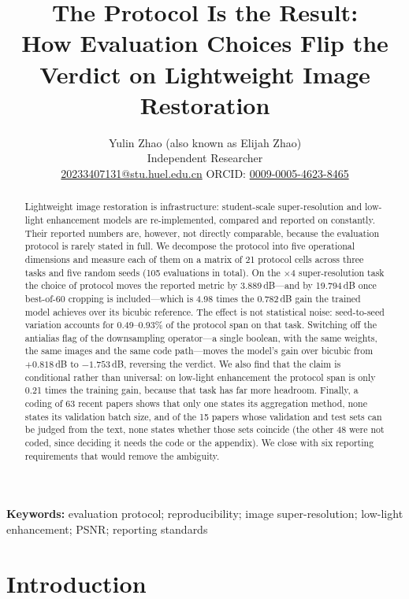 \documentclass[10pt,twocolumn]{article}
\title{\textbf{The Protocol Is the Result:}\\
How Evaluation Choices Flip the Verdict on Lightweight Image Restoration}
\author{Yulin Zhao \quad (also known as Elijah Zhao)\\
Independent Researcher\\
\href{mailto:20233407131@stu.huel.edu.cn}{20233407131@stu.huel.edu.cn}\quad
ORCID: \href{https://orcid.org/0009-0005-4623-8465}{0009-0005-4623-8465}}
\date{}
\begin{document}
\maketitle

\begin{abstract}
Lightweight image restoration is infrastructure: student-scale super-resolution
and low-light enhancement models are re-implemented, compared and reported on
constantly. Their reported numbers are, however, not directly comparable,
because the evaluation protocol is rarely stated in full. We decompose the
protocol into five operational dimensions and measure each of them on a
matrix of 21 protocol cells across three tasks and five random seeds (105
evaluations in total). On the $\times$4 super-resolution task the choice of
protocol moves the reported metric by 3.889\,dB---and by 19.794\,dB once
best-of-60 cropping is included---which is 4.98 times the 0.782\,dB gain the
trained model achieves over its bicubic reference. The effect is not
statistical noise: seed-to-seed variation accounts for 0.49--0.93\% of the
protocol span on that task. Switching off the antialias flag of the
downsampling operator---a single boolean, with the same weights, the same
images and the same code path---moves the model's gain over bicubic from
$+0.818$\,dB to $-1.753$\,dB, reversing the verdict. We also find that the
claim is conditional rather than universal: on low-light enhancement the
protocol span is only 0.21 times the training gain, because that task has
far more headroom. Finally, a coding of 63 recent papers shows that only one
states its aggregation method, none states its validation batch size, and
of the 15 papers whose validation and test sets can be judged from the
text, none states whether those sets coincide (the other 48 were not
coded, since deciding it needs the code or the appendix). We close with six
reporting requirements that would remove the ambiguity.
\end{abstract}

\noindent\textbf{Keywords:} evaluation protocol; reproducibility; image
super-resolution; low-light enhancement; PSNR; reporting standards

\section{Introduction}
\end{document}
